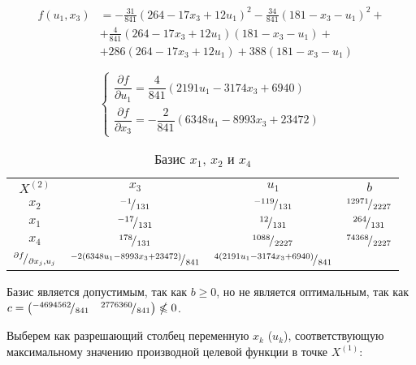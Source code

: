 \begin{align*}
	f(u_1, x_3) &= -\frac{31}{841} (264 - 17 x_3 + 12 u_1)^2 - \frac{34}{841} (181 - x_3 - u_1)^2 + \\ 
	&+ \frac{4}{841} (264 - 17 x_3 + 12 u_1) (181 - x_3 - u_1) + \\ 
	&+ 286 (264 - 17 x_3 + 12 u_1) + 388 (181 - x_3 - u_1)
\end{align*}

\begin{equation*}
\begin{cases}
	\dfrac{\partial f}{\partial u_1} = \dfrac{4}{841} (2191 u_1 - 3174 x_3 + 6940) \\[0.5cm] %
	\dfrac{\partial f}{\partial x_3} = -\dfrac{2}{841} (6348 u_1 - 8993 x_3 + 23472) %
\end{cases}
\end{equation*}

\begin{table}[H]
\begin{center}
	\def\tabcolsep{10pt}
	\def\arraystretch{1.3}
	\caption{Базис $x_1$, $x_2$ и $x_4$}
	\label{tab:simplex_1}
	\begin{tabular}{|c||c|c||c|}
		\hline
		$X^{(2)}$ & $x_3$ & $u_1$ & $b$ \\ 
		\hhline{|=#==#=|}
		$x_2$ & ${}^{-1}\!/_{131}$ & ${}^{-119}\!/_{131}$ & ${}^{12971}\!/_{2227}$ \\ 
		\hline
		$x_1$ & ${}^{-17}\!/_{131}$ & ${}^{12}\!/_{131}$ & ${}^{264}\!/_{131}$ \\ 
		\hline
		$x_4$ & ${}^{178}\!/_{131}$ & ${}^{1088}\!/_{2227}$ & ${}^{74368}\!/_{2227}$ \\ 
		\hhline{|=#==#=|}
		${}^{\partial f}\!/_{\partial x_j, u_j}$ & ${}^{-2 (6348 u_1 - 8993 x_3 + 23472)}\!/_{841}$ & ${}^{4 (2191 u_1 - 3174 x_3 + 6940)}\!/_{841} $ &  \\ 
		\hline
	\end{tabular}
\end{center}
\end{table}

Базис является допустимым, так как $b \geq 0$, но не является оптимальным, так как $c = \begin{pmatrix} {}^{-4694562}\!/_{841} & {}^{2776360}\!/_{841} \end{pmatrix} \nleqslant 0$.

Выберем как разрешающий столбец переменную $x_k$ ($u_k$), соответствующую максимальному значению производной целевой функции в точке $X^{(1)}$: 

